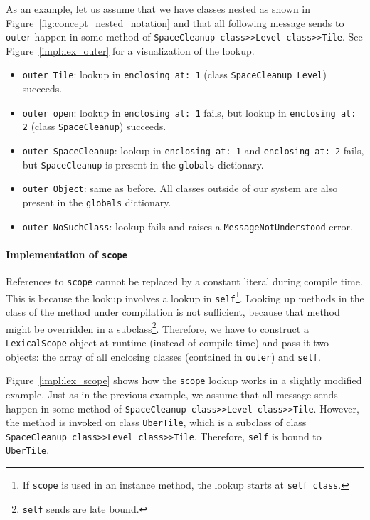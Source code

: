 As an example, let us assume that we have classes nested as shown in Figure~\ref{fig:concept_nested_notation} and that all following message sends to \texttt{outer} happen in some method of \texttt{SpaceCleanup class>>Level class>>Tile}. See Figure~\ref{impl:lex_outer} for a visualization of the lookup.
\begin{itemize}
	\item \texttt{outer Tile}: lookup in \texttt{enclosing at: 1} (class \texttt{SpaceCleanup Level}) succeeds.
	\item \texttt{outer open}: lookup in \texttt{enclosing at: 1} fails, but lookup in \texttt{enclosing at: 2} (class \texttt{SpaceCleanup}) succeeds.
	\item \texttt{outer SpaceCleanup}: lookup in \texttt{enclosing at: 1} and \texttt{enclosing at: 2} fails, but \texttt{SpaceCleanup} is present in the \texttt{globals} dictionary.
	\item \texttt{outer Object}: same as before. All classes outside of our system are also present in the \texttt{globals} dictionary.
	\item \texttt{outer NoSuchClass}: lookup fails and raises a \texttt{MessageNotUnderstood} error.
\end{itemize}

\paragraph{Implementation of \texttt{scope}}
References to \texttt{scope} cannot be replaced by a constant literal during compile time. This is because the lookup involves a lookup in \texttt{self}\footnote{If \texttt{scope} is used in an instance method, the lookup starts at \texttt{self class}.}. Looking up methods in the class of the method under compilation is not sufficient, because that method might be overridden in a subclass\footnote{\texttt{self} sends are late bound.}. Therefore, we have to construct a \texttt{LexicalScope} object at runtime (instead of compile time) and pass it two objects: the array of all enclosing classes (contained in \texttt{outer}) and \texttt{self}.

Figure~\ref{impl:lex_scope} shows how the \texttt{scope} lookup works in a slightly modified example. Just as in the previous example, we assume that all message sends happen in some method of \texttt{SpaceCleanup class>>Level class>>Tile}. However, the method is invoked on class \texttt{UberTile}, which is a subclass of class \texttt{SpaceCleanup class>>Level class>>Tile}. Therefore, \texttt{self} is bound to \texttt{UberTile}.

